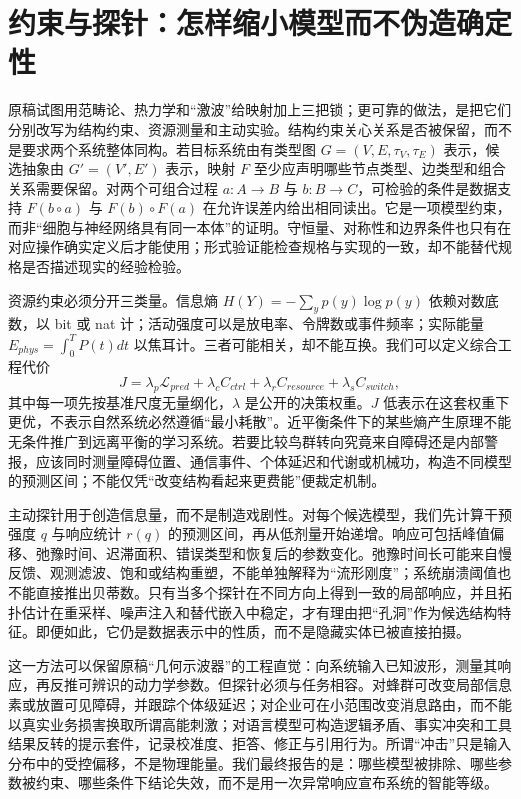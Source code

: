\section{约束与探针：怎样缩小模型而不伪造确定性}
\label{sec:methodological_enhancements}

原稿试图用范畴论、热力学和“激波”给映射加上三把锁；更可靠的做法，是把它们分别改写为结构约束、资源测量和主动实验。结构约束关心关系是否被保留，而不是要求两个系统整体同构。若目标系统由有类型图 $G=(V,E,\tau_V,\tau_E)$ 表示，候选抽象由 $G'=(V',E')$ 表示，映射 $F$ 至少应声明哪些节点类型、边类型和组合关系需要保留。对两个可组合过程 $a:A\rightarrow B$ 与 $b:B\rightarrow C$，可检验的条件是数据支持 $F(b\circ a)$ 与 $F(b)\circ F(a)$ 在允许误差内给出相同读出。它是一项模型约束，而非“细胞与神经网络具有同一本体”的证明。守恒量、对称性和边界条件也只有在对应操作确实定义后才能使用；形式验证能检查规格与实现的一致，却不能替代规格是否描述现实的经验检验。

资源约束必须分开三类量。信息熵 $H(Y)=-\sum_y p(y)\log p(y)$ 依赖对数底数，以 bit 或 nat 计；活动强度可以是放电率、令牌数或事件频率；实际能量 $E_{phys}=\int_0^T P(t)dt$ 以焦耳计。三者可能相关，却不能互换。我们可以定义综合工程代价
\begin{equation}
 J=\lambda_p\mathcal L_{pred}+\lambda_c C_{ctrl}
   +\lambda_r C_{resource}+\lambda_s C_{switch},
\end{equation}
其中每一项先按基准尺度无量纲化，$\lambda$ 是公开的决策权重。$J$ 低表示在这套权重下更优，不表示自然系统必然遵循“最小耗散”。近平衡条件下的某些熵产生原理不能无条件推广到远离平衡的学习系统。若要比较鸟群转向究竟来自障碍还是内部警报，应该同时测量障碍位置、通信事件、个体延迟和代谢或机械功，构造不同模型的预测区间；不能仅凭“改变结构看起来更费能”便裁定机制。

主动探针用于创造信息量，而不是制造戏剧性。对每个候选模型，我们先计算干预强度 $q$ 与响应统计 $r(q)$ 的预测区间，再从低剂量开始递增。响应可包括峰值偏移、弛豫时间、迟滞面积、错误类型和恢复后的参数变化。弛豫时间长可能来自慢反馈、观测滤波、饱和或结构重塑，不能单独解释为“流形刚度”；系统崩溃阈值也不能直接推出贝蒂数。只有当多个探针在不同方向上得到一致的局部响应，并且拓扑估计在重采样、噪声注入和替代嵌入中稳定，才有理由把“孔洞”作为候选结构特征。即便如此，它仍是数据表示中的性质，而不是隐藏实体已被直接拍摄。

这一方法可以保留原稿“几何示波器”的工程直觉：向系统输入已知波形，测量其响应，再反推可辨识的动力学参数。但探针必须与任务相容。对蜂群可改变局部信息素或放置可见障碍，并跟踪个体级延迟；对企业可在小范围改变消息路由，而不能以真实业务损害换取所谓高能刺激；对语言模型可构造逻辑矛盾、事实冲突和工具结果反转的提示套件，记录校准度、拒答、修正与引用行为。所谓“冲击”只是输入分布中的受控偏移，不是物理能量。我们最终报告的是：哪些模型被排除、哪些参数被约束、哪些条件下结论失效，而不是用一次异常响应宣布系统的智能等级。

